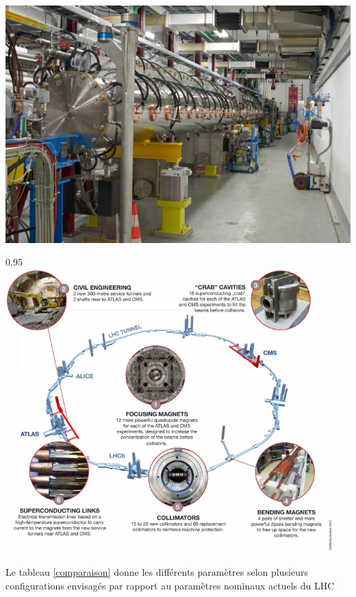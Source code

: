\marginpar
{
	
	\includegraphics[width=\marginparwidth]{LHC/linac4.jpg}
	\label{linac4}
}
\begin{minipagewithmarginpars}[h]{0.95\textwidth}
	\centering
	\includegraphics[width=0.95\textwidth]{LHC/man.jpg}
	\label{man}	
\end{minipagewithmarginpars}

Le tableau \ref{comparaison} donne les différents paramètres selon plusieurs configurations envisagés par rapport au paramètres nominaux actuels du LHC

